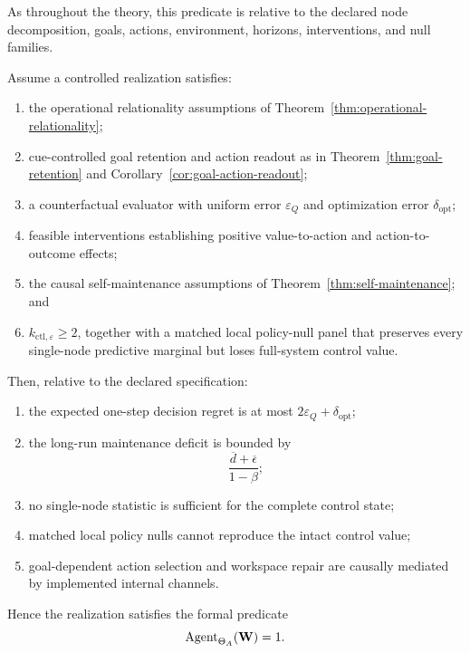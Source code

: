 As throughout the theory, this predicate is relative to the declared node
decomposition, goals, actions, environment, horizons, interventions, and null
families.


\begin{theorem}
\label{thm:agency-synthesis}
Assume a controlled realization satisfies:
\begin{enumerate}
\item the operational relationality assumptions of
 Theorem~\ref{thm:operational-relationality};
\item cue-controlled goal retention and action readout as in
 Theorem~\ref{thm:goal-retention} and
 Corollary~\ref{cor:goal-action-readout};
\item a counterfactual evaluator with uniform error \(\varepsilon_Q\) and
 optimization error \(\delta_{\mathrm{opt}}\);
\item feasible interventions establishing positive value-to-action and
 action-to-outcome effects;
\item the causal self-maintenance assumptions of
 Theorem~\ref{thm:self-maintenance}; and
\item \(k_{\mathrm{ctl},\varepsilon}\geq2\), together with a matched local
 policy-null panel that preserves every single-node predictive marginal
 but loses full-system control value.
\end{enumerate}
Then, relative to the declared specification:
\begin{enumerate}
\item the expected one-step decision regret is at most
 \(2\varepsilon_Q+\delta_{\mathrm{opt}}\);
\item the long-run maintenance deficit is bounded by
 \[
 \frac{\overline d+\overline\epsilon}{1-\beta};
 \]
\item no single-node statistic is sufficient for the complete control state;
\item matched local policy nulls cannot reproduce the intact control value;
\item goal-dependent action selection and workspace repair are causally
 mediated by implemented internal channels.
\end{enumerate}
Hence the realization satisfies the formal predicate
\[
\operatorname{Agent}_{\Theta_A}(\mathbf W)=1.
\]
\end{theorem}

